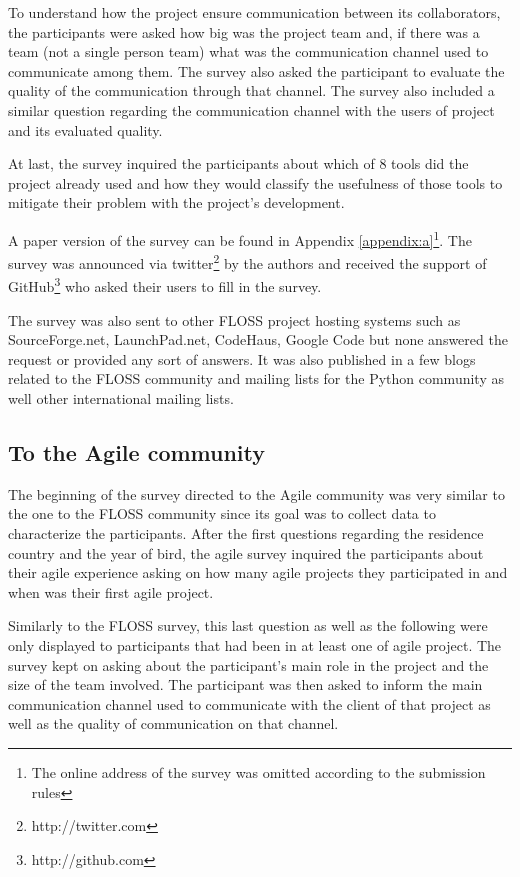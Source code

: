 \documentclass[lnbip]{svmultln}
\begin{document}
To understand how the project ensure communication between its
collaborators, the participants were asked how big was the project
team and, if there was a team (not a single person team) what was the
communication channel used to communicate among them. The survey also
asked the participant to evaluate the quality of the communication
through that channel. The survey also included a similar question
regarding the communication channel with the users of project and its
evaluated quality.

At last, the survey inquired the participants about which of 8 tools
did the project already used and how they would classify the
usefulness of those tools to mitigate their problem with the project's
development.

A paper version of the survey can be found in Appendix
\ref{appendix:a}\footnote{The online address of the survey was omitted
  according to the submission rules}.
The survey was announced via twitter\footnote{http://twitter.com} by
the authors and received the support of
GitHub\footnote{http://github.com} who asked their users to fill in
the survey.

The survey was also sent to other FLOSS project hosting systems such
as SourceForge.net, LaunchPad.net, CodeHaus, Google Code but none
answered the request or provided any sort of answers.  It was also
published in a few blogs related to the FLOSS community and mailing
lists for the Python community as well other international mailing
lists.

\subsection{To the Agile community}
\label{subsec:agile-survey}

The beginning of the survey directed to the Agile community was very
similar to the one to the FLOSS community since its goal was to
collect data to characterize the participants.  After the first
questions regarding the residence country and the year of bird, the
agile survey inquired the participants about their agile experience
asking on how many agile projects they participated in and when was
their first agile project.

Similarly to the FLOSS survey, this last question as well as the
following were only displayed to participants that had been in at
least one of agile project. The survey kept on asking about the
participant's main role in the project and the size of the team
involved. The participant was then asked to inform the main
communication channel used to communicate with the client of that
project as well as the quality of communication on that channel.
\end{document}
